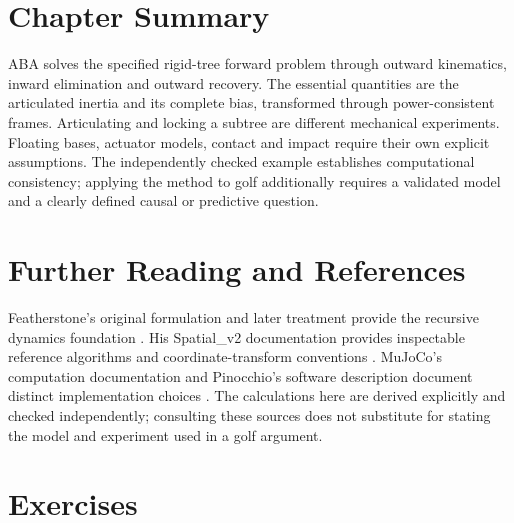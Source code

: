 \section{Chapter Summary}
\label{sec:ch10_summary}

ABA solves the specified rigid-tree forward problem through outward kinematics, inward elimination and outward recovery. The essential quantities are the articulated inertia and its complete bias, transformed through power-consistent frames. Articulating and locking a subtree are different mechanical experiments. Floating bases, actuator models, contact and impact require their own explicit assumptions. The independently checked example establishes computational consistency; applying the method to golf additionally requires a validated model and a clearly defined causal or predictive question.

\section{Further Reading and References}
\label{sec:ch10_further_reading}

Featherstone's original formulation and later treatment provide the recursive dynamics foundation \cite{Featherstone1983,featherstone1987}. His Spatial\_v2 documentation provides inspectable reference algorithms and coordinate-transform conventions \cite{FeatherstoneSpatialReview}. MuJoCo's computation documentation and Pinocchio's software description document distinct implementation choices \cite{MuJoCoComputationReview,PinocchioSoftwareReview}. The calculations here are derived explicitly and checked independently; consulting these sources does not substitute for stating the model and experiment used in a golf argument.

\section{Exercises}
\label{sec:ch10_exercises}


